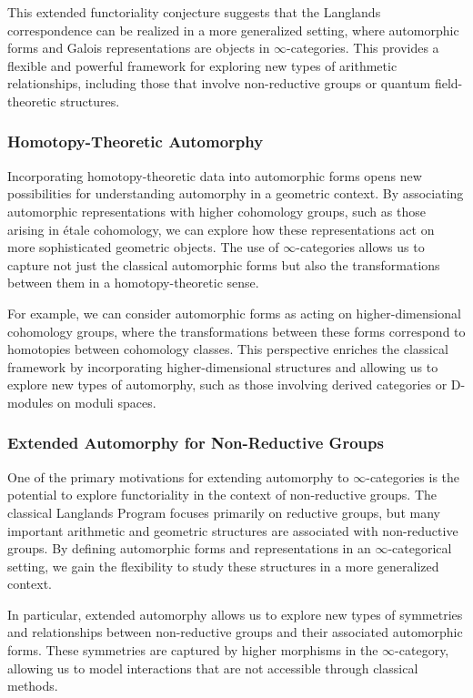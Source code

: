 \documentclass{article}
\theoremstyle{remark}
\begin{document}
This extended functoriality conjecture suggests that the Langlands correspondence can be realized in a more generalized setting, where automorphic forms and Galois representations are objects in $\infty$-categories. This provides a flexible and powerful framework for exploring new types of arithmetic relationships, including those that involve non-reductive groups or quantum field-theoretic structures.

\subsubsection{Homotopy-Theoretic Automorphy}

Incorporating homotopy-theoretic data into automorphic forms opens new possibilities for understanding automorphy in a geometric context. By associating automorphic representations with higher cohomology groups, such as those arising in étale cohomology, we can explore how these representations act on more sophisticated geometric objects. The use of $\infty$-categories allows us to capture not just the classical automorphic forms but also the transformations between them in a homotopy-theoretic sense.

For example, we can consider automorphic forms as acting on higher-dimensional cohomology groups, where the transformations between these forms correspond to homotopies between cohomology classes. This perspective enriches the classical framework by incorporating higher-dimensional structures and allowing us to explore new types of automorphy, such as those involving derived categories or D-modules on moduli spaces.

\subsubsection{Extended Automorphy for Non-Reductive Groups}

One of the primary motivations for extending automorphy to $\infty$-categories is the potential to explore functoriality in the context of non-reductive groups. The classical Langlands Program focuses primarily on reductive groups, but many important arithmetic and geometric structures are associated with non-reductive groups. By defining automorphic forms and representations in an $\infty$-categorical setting, we gain the flexibility to study these structures in a more generalized context.

In particular, extended automorphy allows us to explore new types of symmetries and relationships between non-reductive groups and their associated automorphic forms. These symmetries are captured by higher morphisms in the $\infty$-category, allowing us to model interactions that are not accessible through classical methods.
\end{document}
